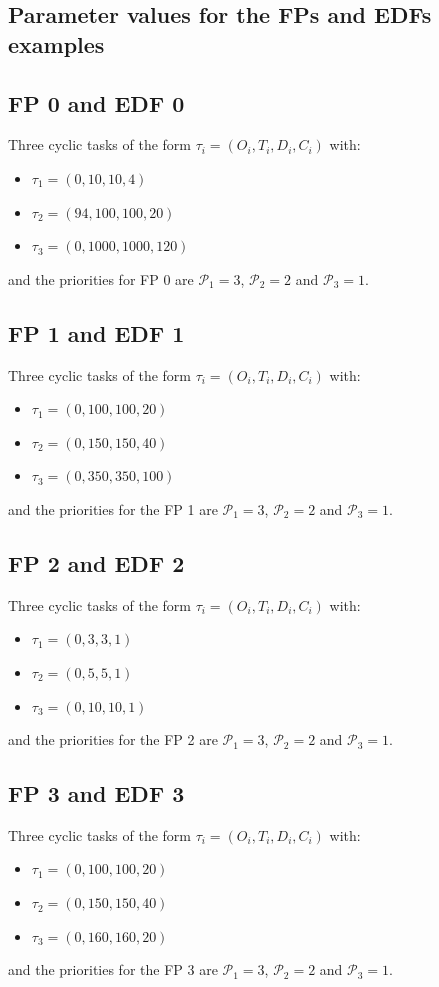 \documentclass{article}
\begin{document}


\newpage
\begin{appendix}
 \section{Parameter values for the FPs and EDFs examples}

\subsection{FP 0 and EDF 0}
Three cyclic tasks of the form $\tau_i = (O_i,T_i,D_i,C_i)$ with:
\begin{itemize}
 \item $\tau_1 = (0,10,10,4)$
 \item $\tau_2 = (94,100,100,20)$
 \item $\tau_3 = (0,1000,1000,120)$
\end{itemize}
and the priorities for FP 0 are $\mathcal{P}_1=3$, $\mathcal{P}_2=2$ and $\mathcal{P}_3=1$.

\subsection{FP 1 and EDF 1}
Three cyclic tasks of the form $\tau_i = (O_i,T_i,D_i,C_i)$ with:
\begin{itemize}
 \item $\tau_1 = (0,100,100,20)$
 \item $\tau_2 = (0,150,150,40)$
 \item $\tau_3 = (0,350,350,100)$
\end{itemize}
and the priorities for the FP 1 are $\mathcal{P}_1=3$, $\mathcal{P}_2=2$ and $\mathcal{P}_3=1$.

\subsection{FP 2 and EDF 2}
Three cyclic tasks of the form $\tau_i = (O_i,T_i,D_i,C_i)$ with:
\begin{itemize}
 \item $\tau_1 = (0,3,3,1)$
 \item $\tau_2 = (0,5,5,1)$
 \item $\tau_3 = (0,10,10,1)$
\end{itemize}
and the priorities for the FP 2 are $\mathcal{P}_1=3$, $\mathcal{P}_2=2$ and $\mathcal{P}_3=1$.

\subsection{FP 3 and EDF 3}
Three cyclic tasks of the form $\tau_i = (O_i,T_i,D_i,C_i)$ with:
\begin{itemize}
 \item $\tau_1 = (0,100,100,20)$
 \item $\tau_2 = (0,150,150,40)$
 \item $\tau_3 = (0,160,160,20)$
\end{itemize}
and the priorities for the FP 3 are $\mathcal{P}_1=3$, $\mathcal{P}_2=2$ and $\mathcal{P}_3=1$.

\end{appendix}
\end{document}
